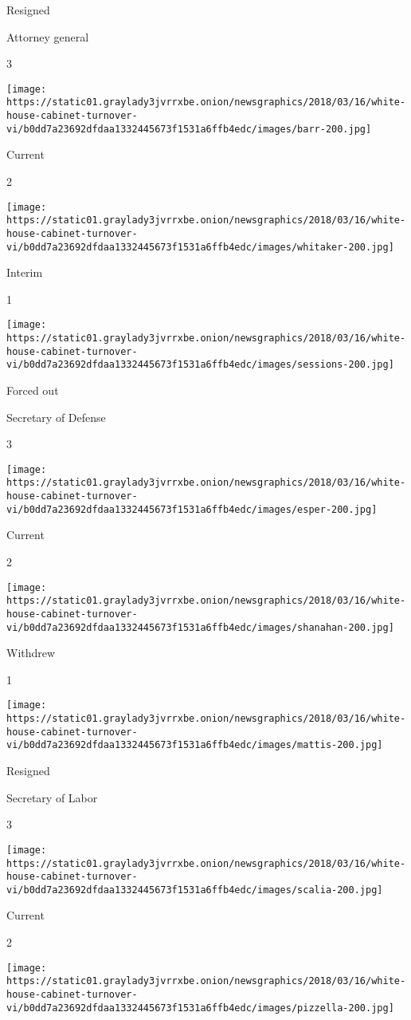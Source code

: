 Resigned

Attorney general

3

\texttt{[image: https://static01.graylady3jvrrxbe.onion/newsgraphics/2018/03/16/white-house-cabinet-turnover-vi/b0dd7a23692dfdaa1332445673f1531a6ffb4edc/images/barr-200.jpg]}

Current

2

\texttt{[image: https://static01.graylady3jvrrxbe.onion/newsgraphics/2018/03/16/white-house-cabinet-turnover-vi/b0dd7a23692dfdaa1332445673f1531a6ffb4edc/images/whitaker-200.jpg]}

Interim

1

\texttt{[image: https://static01.graylady3jvrrxbe.onion/newsgraphics/2018/03/16/white-house-cabinet-turnover-vi/b0dd7a23692dfdaa1332445673f1531a6ffb4edc/images/sessions-200.jpg]}

Forced out

Secretary of Defense

3

\texttt{[image: https://static01.graylady3jvrrxbe.onion/newsgraphics/2018/03/16/white-house-cabinet-turnover-vi/b0dd7a23692dfdaa1332445673f1531a6ffb4edc/images/esper-200.jpg]}

Current

2

\texttt{[image: https://static01.graylady3jvrrxbe.onion/newsgraphics/2018/03/16/white-house-cabinet-turnover-vi/b0dd7a23692dfdaa1332445673f1531a6ffb4edc/images/shanahan-200.jpg]}

Withdrew

1

\texttt{[image: https://static01.graylady3jvrrxbe.onion/newsgraphics/2018/03/16/white-house-cabinet-turnover-vi/b0dd7a23692dfdaa1332445673f1531a6ffb4edc/images/mattis-200.jpg]}

Resigned

Secretary of Labor

3

\texttt{[image: https://static01.graylady3jvrrxbe.onion/newsgraphics/2018/03/16/white-house-cabinet-turnover-vi/b0dd7a23692dfdaa1332445673f1531a6ffb4edc/images/scalia-200.jpg]}

Current

2

\texttt{[image: https://static01.graylady3jvrrxbe.onion/newsgraphics/2018/03/16/white-house-cabinet-turnover-vi/b0dd7a23692dfdaa1332445673f1531a6ffb4edc/images/pizzella-200.jpg]}

